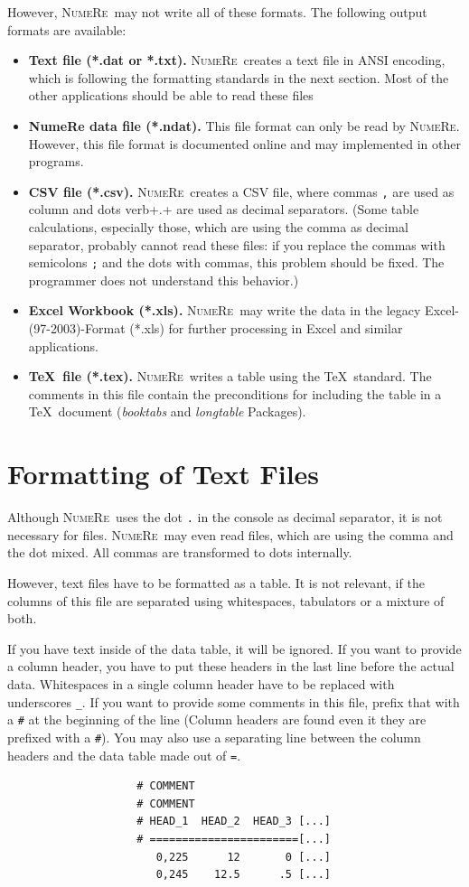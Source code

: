 \documentclass[DIV=14,headsepline,footsepline]{scrbook}
\newcommand{\NR}{\textsc{Nu\-me\-Re}}
\begin{document}
				However, \NR\ may not write all of these formats. The following output formats are available:
				\begin{itemize}
					\item \textbf{Text file (*.dat or *.txt).} \NR\ creates a text file in ANSI encoding, which is following the formatting standards in the next section. Most of the other applications should be able to read these files
					\item \textbf{NumeRe  data file (*.ndat).} This file format can only be read by \NR. However, this file format is documented online and may implemented in other programs.
					\item \textbf{CSV file (*.csv).} \NR\ creates a CSV file, where commas \verb+,+ are used as column and dots verb+.+ are used as decimal separators. (Some table calculations, especially those, which are using the comma as decimal separator, probably cannot read these files: if you replace the commas with semicolons \verb+;+ and the dots with commas, this problem should be fixed. The programmer does not understand this behavior.)
					\item \textbf{Excel Workbook (*.xls).} \NR\ may write the data in the legacy Excel-(97-2003)-Format (*.xls) for further processing in Excel and similar applications.
					\item \textbf{\TeX\ file (*.tex).} \NR\ writes a table using the \TeX\ standard. The comments in this file contain the preconditions for including the table in a \TeX\ document (\emph{booktabs} and \emph{longtable} Packages).
				\end{itemize}
				
			\section{Formatting of Text Files}
				Although \NR\ uses the dot \verb+.+ in the console as decimal separator, it is not necessary for files. \NR\ may even read files, which are using the comma and the dot mixed. All commas are transformed to dots internally.
				
				However, text files have to be formatted as a table. It is not relevant, if the columns of this file are separated using whitespaces, tabulators or a mixture of both.
				
				If you have text inside of the data table, it will be ignored. If you want to provide a column header, you have to put these headers in the last line before the actual data. Whitespaces in a single column header have to be replaced with underscores \verb+_+. If you want to provide some comments in this file, prefix that with a \verb+#+ at the beginning of the line (Column headers are found even it they are prefixed with a \verb+#+). You may also use a separating line between the column headers and the data table made out of \verb+=+.
				\begin{verbatim}
					# COMMENT
					# COMMENT
					# HEAD_1  HEAD_2  HEAD_3 [...]
					# =======================[...]
					   0,225      12       0 [...]
					   0,245    12.5      .5 [...]
				\end{verbatim}
				
\end{document}
